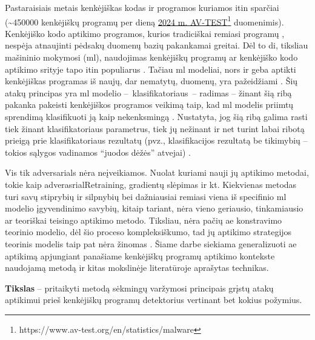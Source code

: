 
Pastaraisiais metais kenkėjiškas kodas ir programos kuriamos itin sparčiai (\sim450000 kenkėjiškų programų per dieną \href{https://www.av-test.org/en/statistics/malware/}{2024 m. AV-TEST}\footnote{https://www.av-test.org/en/statistics/malware} duomenimis). Kenkėjiško kodo aptikimo programos, kurios tradiciškai remiasi programų , nespėja atnaujinti pėdsakų duomenų bazių pakankamai greitai. Dėl to \gls{di}, tiksliau mašininio mokymosi (\gls{ml}), naudojimas kenkėjiškų programų ar kenkėjiško kodo aptikimo srityje tapo itin populiarus \cite{demetrioAdversarialEXEmplesSurvey2021}. Tačiau \gls{ml} modeliai, nors ir geba aptikti kenkėjiškas programas iš naujų, dar nematytų, duomenų, yra pažeidžiami  \cite{castroAIMEDEvolvingMalware2019,huGeneratingAdversarialMalware2017,rosenbergGenericBlackBoxEndEnd2018,zhongReinforcementLearningBased2022}. Šių atakų principas yra \gls{ml} modelio --~klasifikatoriaus~--  radimas -- žinant šią ribą pakanka pakeisti kenkėjiškos programos veikimą taip, kad \gls{ml} modelis priimtų sprendimą klasifikuoti ją kaip nekenksmingą \cite{demetrioAdversarialEXEmplesSurvey2021}. Nustatyta, jog šią ribą galima rasti tiek žinant klasifikatoriaus parametrus, tiek jų nežinant ir net turint labai ribotą prieigą prie klasifikatoriaus rezultatų (pvz., klasifikacijos rezultatą be tikimybių -- tokios sąlygos vadinamos \enquote{juodos dėžės} atvejai) \cite{fangEvadingMalwareEngines2019}.

Vis tik \glspl{adversarial} nėra neįveikiamos. Nuolat kuriami nauji jų aptikimo metodai, tokie kaip \gls{adverasrialRetraining}, gradientų slėpimas ir kt. Kiekvienas metodas turi savų stiprybių ir silpnybių bei dažniausiai remiasi viena iš specifinio \gls{ml} modelio įgyvendinimo savybių, kitaip tariant, nėra vieno geriausio, tinkamiausio ar teoriškai teisingo  aptikimo metodo. 
Tiksliau, nėra pačių \gls{ae} konstravimo teorinio modelio, dėl šio proceso kompleksiškumo, tad jų aptikimo strategijos teorinis modelis taip pat nėra žinomas \cite{chakrabortySurveyAdversarialAttacks2021}. Šiame darbe siekiama generalizuoti \gls{ae} aptikimą apjungiant panašiame kenkėjiškų programų aptikimo kontekste naudojamą \LIME \cite{ribeiroWhyShouldTrust2016} metodą ir kitas mokslinėje literatūroje aprašytas technikas.

\vspace{10pt}
\textbf{Tikslas} -- pritaikyti \LIME metodą sėkmingų varžymosi principais grįstų atakų aptikimui prieš kenkėjiškų programų detektorius vertinant bet kokius požymius.

